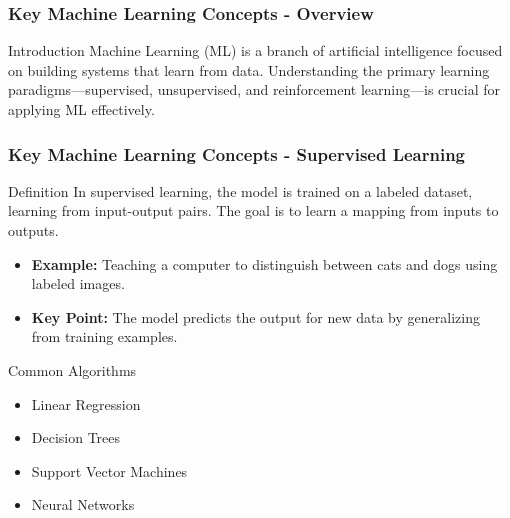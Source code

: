 \documentclass[aspectratio=169]{beamer}
\begin{document}
\begin{frame}[fragile]
    \frametitle{Key Machine Learning Concepts - Overview}
    \begin{block}{Introduction}
        Machine Learning (ML) is a branch of artificial intelligence focused on building systems that learn from data. Understanding the primary learning paradigms—supervised, unsupervised, and reinforcement learning—is crucial for applying ML effectively.
    \end{block}
\end{frame}

\begin{frame}[fragile]
    \frametitle{Key Machine Learning Concepts - Supervised Learning}
    \begin{block}{Definition}
        In supervised learning, the model is trained on a labeled dataset, learning from input-output pairs. The goal is to learn a mapping from inputs to outputs.
    \end{block}
    \begin{itemize}
        \item \textbf{Example:} Teaching a computer to distinguish between cats and dogs using labeled images.
        \item \textbf{Key Point:} The model predicts the output for new data by generalizing from training examples.
    \end{itemize}
    \begin{block}{Common Algorithms}
        \begin{itemize}
            \item Linear Regression
            \item Decision Trees
            \item Support Vector Machines
            \item Neural Networks
        \end{itemize}
    \end{block}
\end{frame}
\end{document}

